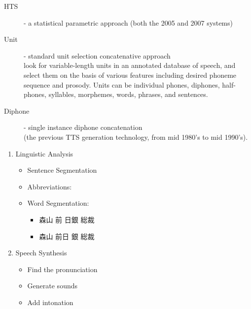 \documentclass[a4paper,landscape,headrule,footrule,xetex]{foils}
\begin{document}
\begin{description}
\item [HTS] - a statistical parametric approach (both the 2005 and 2007 systems)
\item [Unit] - standard unit selection concatenative approach
\\ look for variable-length units in an
annotated database of speech, and select them on the basis of various
features including desired phoneme sequence and prosody.
Units can be individual phones, diphones, half-phones, syllables, morphemes, words, phrases, and sentences. 
\item [Diphone] - single instance diphone concatenation
\\      (the previous TTS generation technology, from mid 1980's to mid 1990's). 
\end{description}


\begin{enumerate}
\item Linguistic Analysis
  \begin{itemize}
  \item Sentence Segmentation
  \item Abbreviations: 
  \item Word Segmentation: 
    \begin{itemize}
    \item 森山 前 日銀 総裁 
    \item[\Bad]  森山 前日 銀 総裁　
      \end{itemize}
    \end{itemize}
\item Speech Synthesis
  \begin{itemize}
  \item Find the pronunciation
  \item Generate sounds
  \item Add intonation
  \end{itemize}
\end{enumerate}

\end{document}
